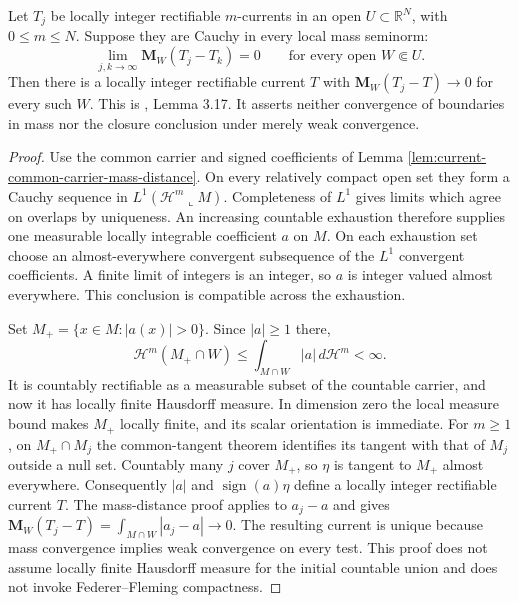 \begin{theorem}\label{thm:integer-rectifiable-local-mass-completeness}
Let $T_j$ be locally integer rectifiable $m$-currents in an open $U\subset\mathbb R^N$, with $0\leq m\leq N$. Suppose they are Cauchy in every local mass seminorm:
\[
 \lim_{j,k\to\infty}\mathbf M_W(T_j-T_k)=0
 \qquad\text{for every open }W\Subset U.
\]
Then there is a locally integer rectifiable current $T$ with $\mathbf M_W(T_j-T)\to0$ for every such $W$. This is \cite{Sim18}, Lemma 3.17. It asserts neither convergence of boundaries in mass nor the closure conclusion under merely weak convergence.
\end{theorem}
\begin{proof}
Use the common carrier and signed coefficients of Lemma \ref{lem:current-common-carrier-mass-distance}. On every relatively compact open set they form a Cauchy sequence in $L^1(\mathcal H^m\llcorner M)$. Completeness of $L^1$ gives limits which agree on overlaps by uniqueness. An increasing countable exhaustion therefore supplies one measurable locally integrable coefficient $a$ on $M$. On each exhaustion set choose an almost-everywhere convergent subsequence of the $L^1$ convergent coefficients. A finite limit of integers is an integer, so $a$ is integer valued almost everywhere. This conclusion is compatible across the exhaustion.

Set $M_+=\{x\in M:|a(x)|>0\}$. Since $|a|\geq1$ there,
\[
 \mathcal H^m(M_+\cap W)\leq\int_{M\cap W}|a|\,d\mathcal H^m<\infty.
\]
It is countably rectifiable as a measurable subset of the countable carrier, and now it has locally finite Hausdorff measure. In dimension zero the local measure bound makes $M_+$ locally finite, and its scalar orientation is immediate. For $m\geq1$, on $M_+\cap M_j$ the common-tangent theorem identifies its tangent with that of $M_j$ outside a null set. Countably many $j$ cover $M_+$, so $\eta$ is tangent to $M_+$ almost everywhere. Consequently $|a|$ and $\operatorname{sign}(a)\eta$ define a locally integer rectifiable current $T$. The mass-distance proof applies to $a_j-a$ and gives $\mathbf M_W(T_j-T)=\int_{M\cap W}|a_j-a|\to0$. The resulting current is unique because mass convergence implies weak convergence on every test. This proof does not assume locally finite Hausdorff measure for the initial countable union and does not invoke Federer--Fleming compactness.
\end{proof}

